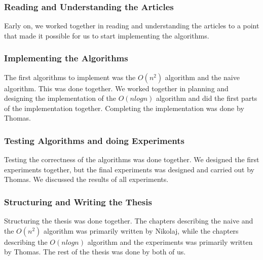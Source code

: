 \subsubsection{Reading and Understanding the Articles}
Early on, we worked together in reading and understanding the articles to a point that made it possible for us to start implementing the algorithms.

\subsubsection{Implementing the Algorithms}
The first algorithms to implement was the $O(n^2)$ algorithm and the naive algorithm. This was done together. We worked together in planning and designing the implementation of the $O(nlogn)$ algorithm and did the first parts of the implementation together. Completing the implementation was done by Thomas.

\subsubsection{Testing Algorithms and doing Experiments}
Testing the correctness of the algorithms was done together. We designed the first experiments together, but the final experiments was designed and carried out by Thomas. We discussed the results of all experiments.

\subsubsection{Structuring and Writing the Thesis}
Structuring the thesis was done together. The chapters describing the naive and the $O(n^2)$ algorithm was primarily written by Nikolaj, while the chapters describing the $O(nlogn)$ algorithm and the experiments was primarily written by Thomas. The rest of the thesis was done by both of us.




